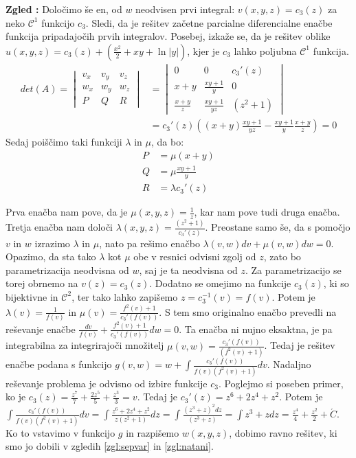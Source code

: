 \documentclass[a4paper, 10pt]{article}
\newcounter{zgledcount}
\newenvironment{zgled}{\begin{flushleft}\refstepcounter{zgledcount}\textbf{Zgled \arabic{zgledcount}:}}{\hfill\end{flushleft}}
\newcommand{\abs}[1]{\ensuremath{\lvert #1 \rvert}}
\begin{document}
\begin{zgled}
							Določimo še en, od $w$ neodvisen prvi integral: $v(x, y, z) = c_3(z)$ za neko $\mathcal{C}^1$ funkcijo $c_3$. Sledi, da je rešitev začetne parcialne diferencialne enačbe funkcija pripadajočih prvih integralov. Posebej, izkaže se, da je rešitev oblike $u(x, y, z) = c_3(z) + (\frac{x^2}{2} + xy +\ln\abs{y})$, kjer je $c_3$ lahko poljubna $\mathcal{C}^1$ funkcija. \begin{align*}
								det(A) = \begin{vmatrix}
									v_x & v_y & v_z \\
									w_x & w_y & w_z \\
									P & Q & R
								\end{vmatrix} &= \begin{vmatrix}
								0 & 0 & c_3'(z) \\
								x+y & \frac{xy+1}{y} & 0 \\
								\frac{x+y}{z} & \frac{xy+1}{yz} & (z^2+1)
								\end{vmatrix} \\
								&= c_3'(z)((x+y)\frac{xy+1}{yz} - \frac{xy+1}{y}\frac{x+y}{z}) = 0
							\end{align*}
							Sedaj poiščimo taki funkciji $\lambda$ in $\mu$, da bo: \begin{align*}
								P &= \mu(x+y) \\
								Q &= \mu \frac{xy+1}{y} \\
								R &= \lambda c_3'(z)
							\end{align*}
							
							Prva enačba nam pove, da je $\mu(x, y, z) = \frac{1}{z}$, kar nam pove tudi druga enačba. Tretja enačba nam določi $\lambda(x, y, z) = \frac{(z^2 +1)}{c_3'(z)}$. Preostane samo še, da s pomočjo $v$ in $w$ izrazimo $\lambda$ in $\mu$, nato pa rešimo enačbo $\lambda(v, w)dv + \mu(v, w)dw = 0$.
							Opazimo, da sta tako $\lambda$ kot $\mu$ obe v resnici odvisni zgolj od $z$, zato bo parametrizacija neodvisna od $w$, saj je ta neodvisna od $z$. Za parametrizacijo se torej obrnemo na $v(z) = c_3(z)$. Dodatno se omejimo na funkcije $c_3(z)$, ki so bijektivne in $\mathcal{C}^2$, ter tako lahko zapišemo $z = c_3^{-1}(v) = f(v)$. Potem je $\lambda(v) = \frac{1}{f(v)}$ in $\mu(v) = \frac{f^2(v) + 1}{c_3'(f(v))}$. S tem smo originalno enačbo prevedli na reševanje enačbe $\frac{dv}{f(v)} + \frac{f^2(v)+1}{c_3'(f(v))}dw = 0$. Ta enačba ni nujno eksaktna, je pa integrabilna za integrirajoči množitelj $\mu(v, w) = \frac{c_3'(f(v))}{(f^2(v) + 1)}$. Tedaj je rešitev enačbe podana s funkcijo $g(v, w) = w + \int \frac{c_3'(f(v))}{f(v)(f^2(v) + 1)}dv$.
							Nadaljno reševanje problema je odvisno od izbire funkcije $c_3$. Poglejmo si poseben primer, ko je $c_3(z) = \frac{z^7}{7} + \frac{2z^5}{5} + \frac{z^3}{3} = v$. Tedaj je $c_3'(z) = z^6 + 2z^4 + z^2$. Potem je $\int \frac{c_3'(f(v))}{f(v)(f^2(v) + 1)}dv = \int \frac{z^6 + 2z^4 + z^2}{z(z^2 + 1)}dz = \int \frac{(z^3 + z)^2dz}{(z^3 + z)} = \int z^3 + z dz = \frac{z^4}{4} + \frac{z^2}{2} + \acute{C}$. Ko to vstavimo v funkcijo $g$ in razpišemo $w(x, y, z)$, dobimo ravno rešitev, ki smo jo dobili v zgledih \ref{zgl:sepvar} in \ref{zgl:natani}.
						\end{zgled}
						
\end{document}
